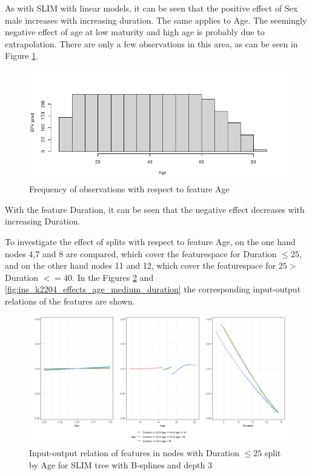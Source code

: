 As with SLIM with linear models, it can be seen that the positive effect of Sex male increases with increasing duration. The same applies to Age. The seemingly negative effect of age at low maturity and high age is probably due to extrapolation. There are only a few observations in this area, as can be seen in Figure \ref{fig:ins_k2204_hist_age}.

\begin{figure}[!htb]
    \centering
    \includegraphics[width = 14cm]{Figures/insurance_use_case/k2204_BPV/hist_age.png}
    \caption{Frequency of observations with respect to feature Age}
    \label{fig:ins_k2204_hist_age}
\end{figure}

With the feature Duration, it can be seen that the negative effect decreases with increasing Duration.

To investigate the effect of splits with respect to feature Age, on the one hand nodes 4,7 and 8 are compared, which cover the featurespace for Duration $\leq 25$, and on the other hand nodes 11 and 12, which cover the featurespace for $25 > $Duration $<= 40$. In the Figures \ref{fig:ins_k2204_effects_age_low_duration} and \ref{fig:ins_k2204_effects_age_medium_duration} the corresponding input-output relations of the features are shown.

\begin{figure}[!htb]
    \centering    
    \includegraphics[width = 16cm]{Figures/insurance_use_case/k2204_BPV/effects_age_low_duration.png}
    \caption{Input-output relation of features in nodes with Duration $\leq 25$ split by Age for SLIM tree with B-splines and depth 3}
    \label{fig:ins_k2204_effects_age_low_duration}
\end{figure}

